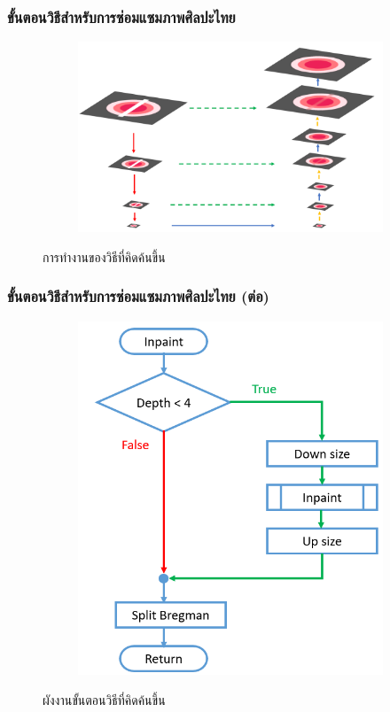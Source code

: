 \documentclass[xcolor=dvipsnames, xetex,serif]{beamer}
\numberwithin{equation}{section}
\begin{document}
    \begin{frame}
		\frametitle{ขั้นตอนวิธีสำหรับการซ่อมแซมภาพศิลปะไทย}
		\begin{figure}[H]
			\centering
			\begin{subfigure}{0.7\linewidth}
				\centering
				\includegraphics[width=1\linewidth]{images/method_thaiart/step_thaiart.png}
			\end{subfigure}
			\caption{การทำงานของวิธีที่คิดค้นขึ้น}
        \end{figure}
	\end{frame}
	\begin{frame}
		\frametitle{ขั้นตอนวิธีสำหรับการซ่อมแซมภาพศิลปะไทย (ต่อ)}
		\begin{figure}[H]
			\centering
			\begin{subfigure}{0.5\linewidth}
				\centering
				\includegraphics[width=1\linewidth]{images/method_thaiart/flowchart_thaiart.png}
			\end{subfigure}
			\caption{ผังงานขั้นตอนวิธีที่คิดค้นขึ้น}
		\end{figure}
	\end{frame}
\end{document}
